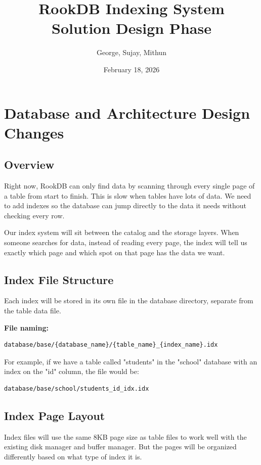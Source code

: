 \documentclass[11pt,a4paper]{article}
\title{RookDB Indexing System\\Solution Design Phase}
\author{George, Sujay, Mithun}
\date{February 18, 2026}
\begin{document}
\maketitle

\section{Database and Architecture Design Changes}

\subsection{Overview}

Right now, RookDB can only find data by scanning through every single page of a table from start to finish. This is slow when tables have lots of data. We need to add indexes so the database can jump directly to the data it needs without checking every row.

Our index system will sit between the catalog and the storage layers. When someone searches for data, instead of reading every page, the index will tell us exactly which page and which spot on that page has the data we want.

\subsection{Index File Structure}

Each index will be stored in its own file in the database directory, separate from the table data file.

\textbf{File naming:}
\begin{lstlisting}
database/base/{database_name}/{table_name}_{index_name}.idx
\end{lstlisting}

For example, if we have a table called "students" in the "school" database with an index on the "id" column, the file would be:
\begin{lstlisting}
database/base/school/students_id_idx.idx
\end{lstlisting}

\subsection{Index Page Layout}

Index files will use the same 8KB page size as table files to work well with the existing disk manager and buffer manager. But the pages will be organized differently based on what type of index it is.
\end{document}
